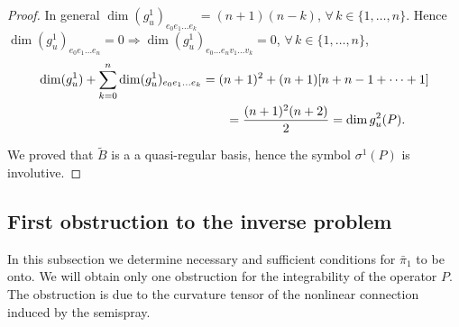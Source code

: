 \documentclass[pdftex]{sigma}
\begin{document}
\begin{proof}
In general $\dim (g_{u}^{1})_{e_{0} e_{1} \dots e_{k}}=(n+1)(n-k)$, $\forall\, k\in \{1,\dots,n\}$.
Hence $\dim (g_{u}^{1})_{e_{0} e_{1} \dots e_{n}}=0\Rightarrow\dim (g_{u}^{1})_{e_{0} \dots e_{n} v_{1} \dots v_{k}}=0$, $\forall\, k\in \{1,\dots,n\}$,
\begin{gather*}
\dim (g_{u}^{1})+\sum_{k=0}^{n}\dim (g_{u}^{1})_{e_{0} e_{1} \dots e_{k}}
   =   (n+1)^{2}+(n+1)[n+n-1+\cdots+1]\\
\hphantom{\dim (g_{u}^{1})+\sum_{k=0}^{n}\dim (g_{u}^{1})_{e_{0} e_{1} \dots e_{k}}}{}   =   \frac{(n+1)^{2}(n+2)}{2}=\dim g_{u}^{2}(P).
   \end{gather*}


We proved that $\tilde{B}$ is a a quasi-regular basis, hence the
symbol $\sigma^{1}(P)$ is involutive.
\end{proof}




\subsection{First obstruction to the inverse problem}

In this subsection we determine necessary and suf\/f\/icient conditions
for $\bar{\pi}_{1}$ to be onto. We will obtain only one obstruction
for the integrability of the operator $P$. The obstruction is due
to the curvature tensor of the nonlinear connection induced by the
semispray.
\end{document}
